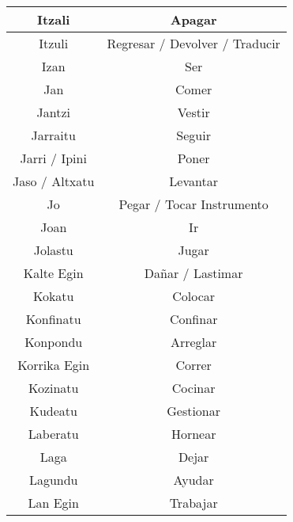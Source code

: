 \documentclass[11pt, a4paper]{article}
\begin{document}
\begin{longtable}{cc}
    \hline
    Itzali                        & Apagar                         \\
    \hline
    Itzuli                        & Regresar / Devolver / Traducir \\
    \hline
    Izan                          & Ser                            \\
    \hline
    Jan                           & Comer                          \\
    \hline
    Jantzi                        & Vestir                         \\
    \hline
    Jarraitu                      & Seguir                         \\
    \hline
    Jarri / Ipini                 & Poner                          \\
    \hline
    Jaso / Altxatu                & Levantar                       \\
    \hline
    Jo                            & Pegar / Tocar Instrumento      \\
    \hline
    Joan                          & Ir                             \\
    \hline
    Jolastu                       & Jugar                          \\
    \hline
    Kalte Egin                    & Dañar / Lastimar               \\
    \hline
    Kokatu                        & Colocar                        \\
    \hline
    Konfinatu                     & Confinar                       \\
    \hline
    Konpondu                      & Arreglar                       \\
    \hline
    Korrika Egin                  & Correr                         \\
    \hline
    Kozinatu                      & Cocinar                        \\
    \hline
    Kudeatu                       & Gestionar                      \\
    \hline
    Laberatu                      & Hornear                        \\
    \hline
    Laga                          & Dejar                          \\
    \hline
    Lagundu                       & Ayudar                         \\
    \hline
    Lan Egin                      & Trabajar                       \\

\end{longtable}
\end{document}
